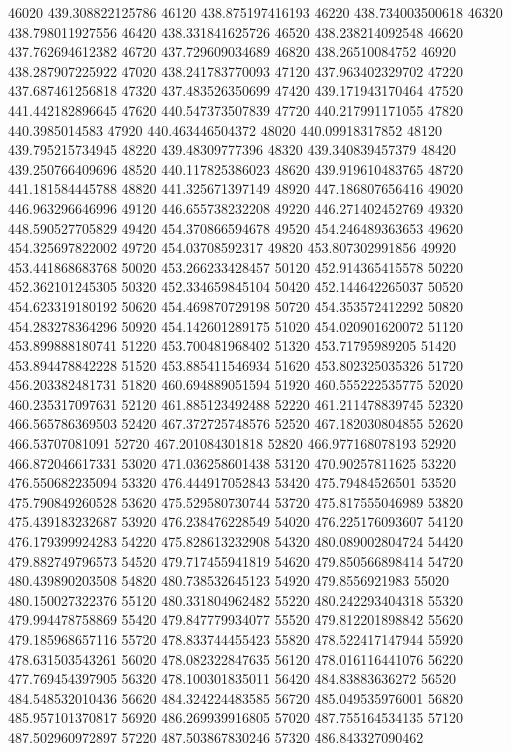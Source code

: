 {46020 439.308822125786
46120 438.875197416193
46220 438.734003500618
46320 438.798011927556
46420 438.331841625726
46520 438.238214092548
46620 437.762694612382
46720 437.729609034689
46820 438.26510084752
46920 438.287907225922
47020 438.241783770093
47120 437.963402329702
47220 437.687461256818
47320 437.483526350699
47420 439.171943170464
47520 441.442182896645
47620 440.547373507839
47720 440.217991171055
47820 440.3985014583
47920 440.463446504372
48020 440.09918317852
48120 439.795215734945
48220 439.48309777396
48320 439.340839457379
48420 439.250766409696
48520 440.117825386023
48620 439.919610483765
48720 441.181584445788
48820 441.325671397149
48920 447.186807656416
49020 446.963296646996
49120 446.655738232208
49220 446.271402452769
49320 448.590527705829
49420 454.370866594678
49520 454.246489363653
49620 454.325697822002
49720 454.03708592317
49820 453.807302991856
49920 453.441868683768
50020 453.266233428457
50120 452.914365415578
50220 452.362101245305
50320 452.334659845104
50420 452.144642265037
50520 454.623319180192
50620 454.469870729198
50720 454.353572412292
50820 454.283278364296
50920 454.142601289175
51020 454.020901620072
51120 453.899888180741
51220 453.700481968402
51320 453.71795989205
51420 453.894478842228
51520 453.885411546934
51620 453.802325035326
51720 456.203382481731
51820 460.694889051594
51920 460.555222535775
52020 460.235317097631
52120 461.885123492488
52220 461.211478839745
52320 466.565786369503
52420 467.372725748576
52520 467.182030804855
52620 466.53707081091
52720 467.201084301818
52820 466.977168078193
52920 466.872046617331
53020 471.036258601438
53120 470.90257811625
53220 476.550682235094
53320 476.444917052843
53420 475.79484526501
53520 475.790849260528
53620 475.529580730744
53720 475.817555046989
53820 475.439183232687
53920 476.238476228549
54020 476.225176093607
54120 476.179399924283
54220 475.828613232908
54320 480.089002804724
54420 479.882749796573
54520 479.717455941819
54620 479.850566898414
54720 480.439890203508
54820 480.738532645123
54920 479.8556921983
55020 480.150027322376
55120 480.331804962482
55220 480.242293404318
55320 479.994478758869
55420 479.847779934077
55520 479.812201898842
55620 479.185968657116
55720 478.833744455423
55820 478.522417147944
55920 478.631503543261
56020 478.082322847635
56120 478.016116441076
56220 477.769454397905
56320 478.100301835011
56420 484.83883636272
56520 484.548532010436
56620 484.324224483585
56720 485.049535976001
56820 485.957101370817
56920 486.269939916805
57020 487.755164534135
57120 487.502960972897
57220 487.503867830246
57320 486.843327090462
}
